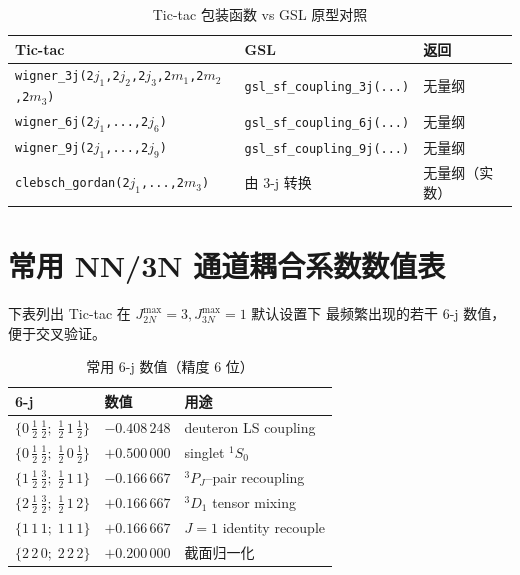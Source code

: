 \begin{table}[htbp]
\centering
\caption{Tic-tac 包装函数 vs GSL 原型对照}
\label{tab:appB_gsl_signature}
\begin{tabular}{@{}lll@{}}
\toprule
Tic-tac & GSL & 返回 \\
\midrule
\texttt{wigner\_3j(2$j_1$,2$j_2$,2$j_3$,2$m_1$,2$m_2$,2$m_3$)}
& \texttt{gsl\_sf\_coupling\_3j(...)} & \si{无量纲} \\
\texttt{wigner\_6j(2$j_1$,...,2$j_6$)}
& \texttt{gsl\_sf\_coupling\_6j(...)} & \si{无量纲} \\
\texttt{wigner\_9j(2$j_1$,...,2$j_9$)}
& \texttt{gsl\_sf\_coupling\_9j(...)} & \si{无量纲} \\
\texttt{clebsch\_gordan(2$j_1$,...,2$m_3$)}
& 由 3-j 转换 & \si{无量纲}（实数） \\
\bottomrule
\end{tabular}
\end{table}

\section{常用 NN/3N 通道耦合系数数值表}
\label{sec:appB_numerical_table}

下表列出 Tic-tac 在
$J_{2N}^{\max} = 3, J_{3N}^{\max} = 1$ 默认设置下
最频繁出现的若干 6-j 数值，便于交叉验证。

\begin{table}[htbp]
\centering
\caption{常用 6-j 数值（精度 6 位）}
\label{tab:appB_6j_values}
\begin{tabular}{@{}lll@{}}
\toprule
6-j & 数值 & 用途 \\
\midrule
$\{0\,\tfrac12\,\tfrac12;\;\tfrac12\,1\,\tfrac12\}$ & $-0.408\,248$ & deuteron LS coupling \\
$\{0\,\tfrac12\,\tfrac12;\;\tfrac12\,0\,\tfrac12\}$ & $+0.500\,000$ & singlet $^1S_0$ \\
$\{1\,\tfrac12\,\tfrac32;\;\tfrac12\,1\,1\}$         & $-0.166\,667$ & $^3P_J$–pair recoupling \\
$\{2\,\tfrac12\,\tfrac32;\;\tfrac12\,1\,2\}$         & $+0.166\,667$ & $^3D_1$ tensor mixing \\
$\{1\,1\,1;\;1\,1\,1\}$                              & $+0.166\,667$ & $J=1$ identity recouple \\
$\{2\,2\,0;\;2\,2\,2\}$                              & $+0.200\,000$ & 截面归一化 \\
\bottomrule
\end{tabular}
\end{table}

